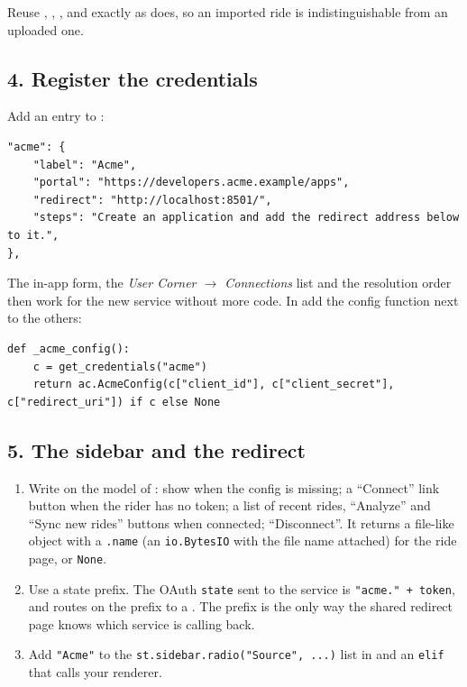 Reuse , , , 
and  exactly as  does, so an imported ride is indistinguishable from
an uploaded one.

\subsection*{4. Register the credentials}

Add an entry to :

\begin{lstlisting}
"acme": {
    "label": "Acme",
    "portal": "https://developers.acme.example/apps",
    "redirect": "http://localhost:8501/",
    "steps": "Create an application and add the redirect address below to it.",
},
\end{lstlisting}

The in-app form, the \emph{User Corner $\rightarrow$ Connections} list and the resolution order then work for the new
service without more code. In  add the config function next to the others:

\begin{lstlisting}
def _acme_config():
    c = get_credentials("acme")
    return ac.AcmeConfig(c["client_id"], c["client_secret"], c["redirect_uri"]) if c else None
\end{lstlisting}

\subsection*{5. The sidebar and the redirect}

\begin{enumerate}
\item Write  on the model of :
  show  when the config is missing; a ``Connect'' link button when the rider has no token;
  a list of recent rides, ``Analyze'' and ``Sync new rides'' buttons when connected; ``Disconnect''. It returns a
  file-like object with a \texttt{.name} (an \texttt{io.BytesIO} with the file name attached) for the ride page, or
  \texttt{None}.
\item Use a state prefix. The OAuth \texttt{state} sent to the service is \texttt{"acme." + token}, and
   routes on the prefix to a . The prefix is the only way
  the shared redirect page knows which service is calling back.
\item Add \texttt{"Acme"} to the \texttt{st.sidebar.radio("Source", ...)} list in  and an
  \texttt{elif} that calls your renderer.
\end{enumerate}


